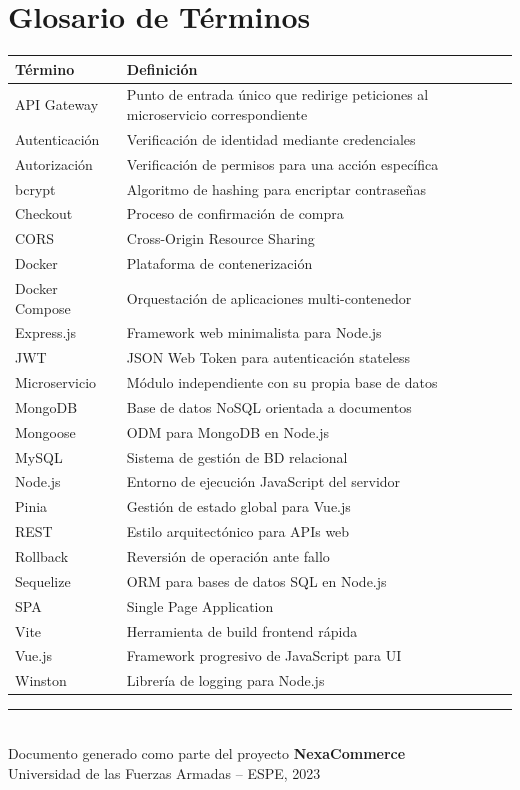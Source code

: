 \documentclass[12pt,a4paper]{article}
\begin{document}
\newpage
\section{Glosario de T\'erminos}

\begin{longtable}{lp{10cm}}
\toprule
\textbf{T\'ermino} & \textbf{Definici\'on} \\
\midrule
\endhead
API Gateway & Punto de entrada \'unico que redirige peticiones al microservicio correspondiente \\
Autenticaci\'on & Verificaci\'on de identidad mediante credenciales \\
Autorizaci\'on & Verificaci\'on de permisos para una acci\'on espec\'ifica \\
bcrypt & Algoritmo de hashing para encriptar contrase\~nas \\
Checkout & Proceso de confirmaci\'on de compra \\
CORS & Cross-Origin Resource Sharing \\
Docker & Plataforma de contenerizaci\'on \\
Docker Compose & Orquestaci\'on de aplicaciones multi-contenedor \\
Express.js & Framework web minimalista para Node.js \\
JWT & JSON Web Token para autenticaci\'on stateless \\
Microservicio & M\'odulo independiente con su propia base de datos \\
MongoDB & Base de datos NoSQL orientada a documentos \\
Mongoose & ODM para MongoDB en Node.js \\
MySQL & Sistema de gesti\'on de BD relacional \\
Node.js & Entorno de ejecuci\'on JavaScript del servidor \\
Pinia & Gesti\'on de estado global para Vue.js \\
REST & Estilo arquitect\'onico para APIs web \\
Rollback & Reversi\'on de operaci\'on ante fallo \\
Sequelize & ORM para bases de datos SQL en Node.js \\
SPA & Single Page Application \\
Vite & Herramienta de build frontend r\'apida \\
Vue.js & Framework progresivo de JavaScript para UI \\
Winston & Librer\'ia de logging para Node.js \\
\bottomrule
\end{longtable}

\vfill
\begin{center}
\rule{0.5\textwidth}{0.4pt}\\[6pt]
{\small Documento generado como parte del proyecto \textbf{NexaCommerce}}\\
{\small Universidad de las Fuerzas Armadas -- ESPE, 2023}
\end{center}
\end{document}
